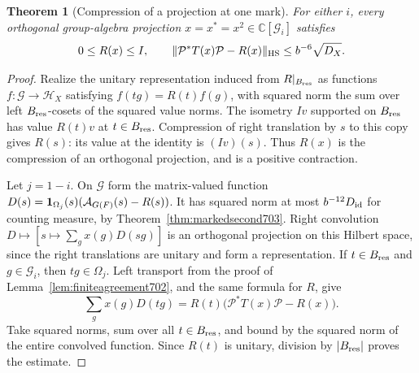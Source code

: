 \documentclass[a4paper,11pt]{article}
\newtheorem{theorem}[proposition]{Theorem}
\theoremstyle{definition}
\theoremstyle{remark}
\numberwithin{equation}{section}
\begin{document}
\begin{theorem}[Compression of a projection at one mark]\leavevmode
\label{thm:singleprojection704}
For either \(i\), every orthogonal group-algebra projection
\(x=x^*=x^2\in\mathbb C[\mathcal G_i]\) satisfies
\[
   0\le R(x)\le I,\qquad
   \|\mathcal P^*T(x)\mathcal P-R(x)\|_{\rm HS}
                      \le b^{-6}\sqrt{D_X}.
\]
\end{theorem}
\begin{proof}
Realize the unitary representation induced from \(R|_{B_{\rm res}}\)
as functions \(f:\mathcal G\to\mathcal H_X\) satisfying
\(f(tg)=R(t)f(g)\), with squared norm the sum over left
\(B_{\rm res}\)-cosets of the squared value norms. The isometry
\(Iv\) supported on \(B_{\rm res}\) has value \(R(t)v\) at
\(t\in B_{\rm res}\). Compression of right translation by \(s\)
to this copy gives \(R(s)\): its value at the identity is
\((Iv)(s)\). Thus \(R(x)\) is the compression of an orthogonal
projection, and is a positive contraction.

Let \(j=1-i\). On \(\mathcal G\) form the matrix-valued
function \(D(s)={\bf1}_{\Omega_j}(s)
(\mathcal A_{G(F)}(s)-R(s))\).
It has squared norm at most \(b^{-12}D_{\rm id}\) for counting
measure, by Theorem~\ref{thm:markedsecond703}. Right
convolution \(D\mapsto[s\mapsto\sum_g x(g)D(sg)]\) is an
orthogonal projection on this Hilbert space, since the right
translations are unitary and form a representation. If
\(t\in B_{\rm res}\) and \(g\in\mathcal G_i\), then
\(tg\in\Omega_j\). Left transport from the proof of
Lemma~\ref{lem:finiteagreement702}, and the same formula for
\(R\), give
\[
    \sum_g x(g)D(tg)
       =R(t)\big(\mathcal P^*T(x)\mathcal P-R(x)\big).
\]
Take squared norms, sum over all \(t\in B_{\rm res}\), and
bound by the squared norm of the entire convolved function.
Since \(R(t)\) is unitary, division by \(|B_{\rm res}|\)
proves the estimate.
\end{proof}
\end{document}
